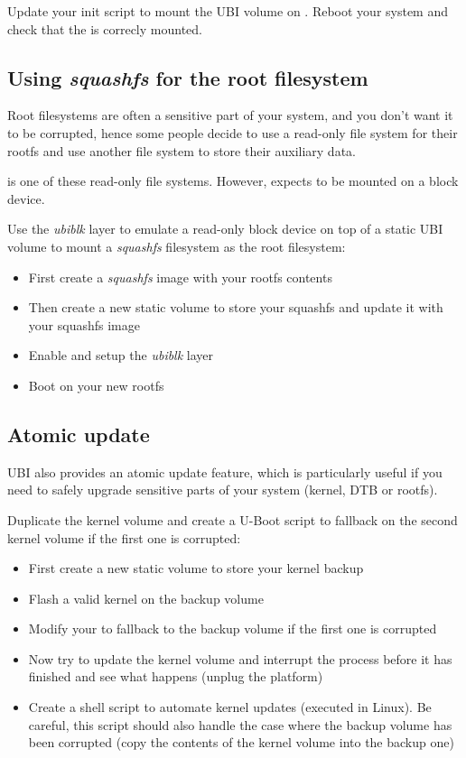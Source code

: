 Update your init script to mount the UBI  volume on .
Reboot your system and check that the  is correcly mounted.

%
%

\subsection{Using {\em squashfs} for the root filesystem}

Root filesystems are often a sensitive part of your system, and you don't
want it to be corrupted, hence some people decide to use a read-only
file system for their rootfs and use another file system to store their
auxiliary data.

 is one of these read-only file systems. However,
 expects to be mounted on a block device.

Use the {\em ubiblk} layer to emulate a read-only block device on top
of a static UBI volume to mount a {\em squashfs} filesystem as the
root filesystem:

\begin{itemize}
  \item First create a {\em squashfs} image with your rootfs contents
  \item Then create a new static volume to store your squashfs and update it with
    your squashfs image
  \item Enable and setup the {\em ubiblk} layer
  \item Boot on your new rootfs
\end{itemize}


\subsection{Atomic update}

UBI also provides an atomic update feature, which is particularly useful
if you need to safely upgrade sensitive parts of your system (kernel,
DTB or rootfs).

Duplicate the kernel volume and create a U-Boot script to fallback on
the second kernel volume if the first one is corrupted:
\begin{itemize}
  \item First create a new static volume to store your kernel backup
  \item Flash a valid kernel on the backup volume
  \item Modify your  to fallback to the backup volume if the first one
    is corrupted
  \item Now try to update the kernel volume and interrupt the process before
    it has finished and see what happens (unplug the platform)
  \item Create a shell script to automate kernel updates (executed in Linux).
    Be careful, this script should also handle the case where the backup
    volume has been corrupted (copy the contents of the kernel volume into
    the backup one)
\end{itemize}

